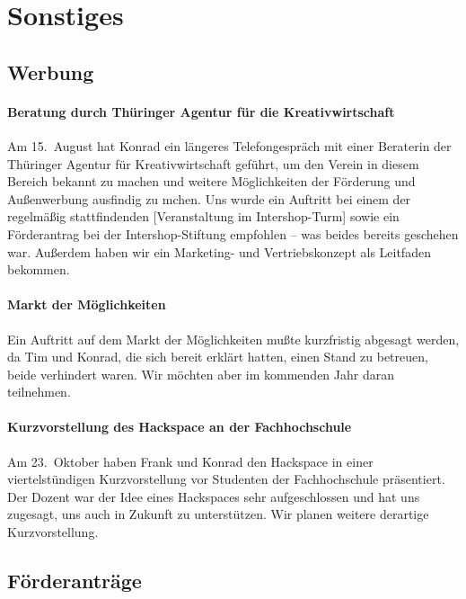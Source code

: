 \documentclass[10pt,DIV16]{scrartcl}
\begin{document}
\section{Sonstiges}

\subsection{Werbung}

\paragraph{Beratung durch Thüringer Agentur für die Kreativwirtschaft}

Am 15.~August hat Konrad ein längeres Telefongespräch mit einer Beraterin der
Thüringer Agentur für Kreativwirtschaft geführt, um den Verein in diesem
Bereich bekannt zu machen und weitere Möglichkeiten der Förderung und
Außenwerbung ausfindig zu mchen.  Uns wurde ein Auftritt bei einem der
regelmäßig stattfindenden [Veranstaltung im Intershop-Turm] sowie ein
Förderantrag bei der Intershop-Stiftung empfohlen -- was beides bereits
geschehen war.  Außerdem haben wir ein Marketing- und Vertriebskonzept als
Leitfaden bekommen.

\paragraph{Markt der Möglichkeiten}

Ein Auftritt auf dem Markt der Möglichkeiten mußte kurzfristig abgesagt
werden, da Tim und Konrad, die sich bereit erklärt hatten, einen Stand zu
betreuen, beide verhindert waren.  Wir möchten aber im kommenden Jahr daran
teilnehmen.

\paragraph{Kurzvorstellung des Hackspace an der Fachhochschule}

Am 23.~Oktober haben Frank und Konrad den Hackspace in einer viertelstündigen
Kurzvorstellung vor Studenten der Fachhochschule präsentiert.  Der Dozent war
der Idee eines Hackspaces sehr aufgeschlossen und hat uns zugesagt, uns auch
in Zukunft zu unterstützen.  Wir planen weitere derartige Kurzvorstellung.

\subsection{Förderanträge}
\end{document}
